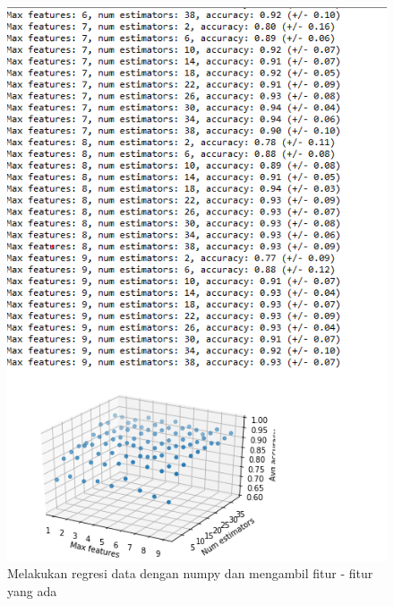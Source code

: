 \begin{enumerate}
\begin{figure}[ht]
        \includegraphics[scale=0.2]{figures/1174035/chapter4/8_praktek.png}
        \caption{Melakukan regresi data dengan numpy dan mengambil fitur - fitur yang ada}
        \label{contoh12}
    \end{figure}
\end{enumerate}
